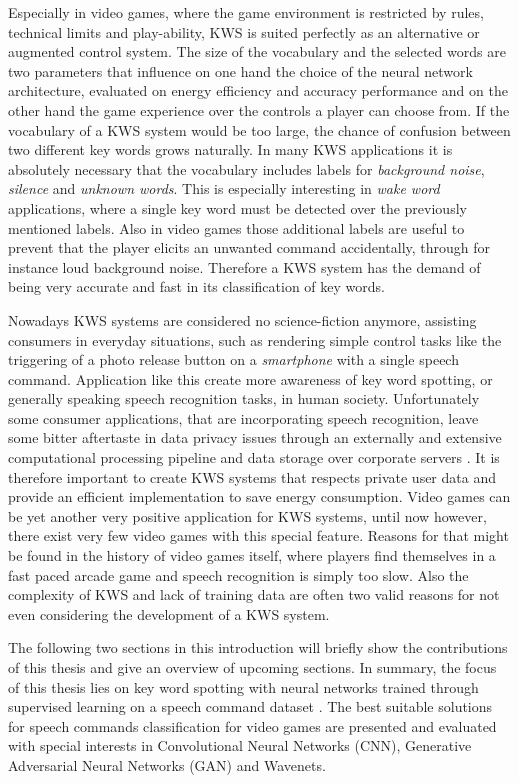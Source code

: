 Especially in video games, where the game environment is restricted by rules, technical limits and play-ability, KWS is suited perfectly as an alternative or augmented control system.
The size of the vocabulary and the selected words are two parameters that influence on one hand the choice of the neural network architecture, evaluated on energy efficiency and accuracy performance and on the other hand the game experience over the controls a player can choose from.
If the vocabulary of a KWS system would be too large, the chance of confusion between two different key words grows naturally.
In many KWS applications it is absolutely necessary that the vocabulary includes labels for \emph{background noise}, \emph{silence} and \emph{unknown words}. 
This is especially interesting in \emph{wake word} applications, where a single key word must be detected over the previously mentioned labels.
Also in video games those additional labels are useful to prevent that the player elicits an unwanted command accidentally, through for instance loud background noise.
Therefore a KWS system has the demand of being very accurate and fast in its classification of key words.

Nowadays KWS systems are considered no science-fiction anymore, assisting consumers in everyday situations, such as rendering simple control tasks like the triggering of a photo release button on a \emph{smartphone} with a single speech command.
Application like this create more awareness of key word spotting, or generally speaking speech recognition tasks, in human society.
Unfortunately some consumer applications, that are incorporating speech recognition, leave some bitter aftertaste in data privacy issues through an externally and extensive computational processing pipeline and data storage over corporate servers \cite{Tang2018}.
It is therefore important to create KWS systems that respects private user data and provide an efficient implementation to save energy consumption. 
Video games can be yet another very positive application for KWS systems, until now however, there exist very few video games with this special feature.
Reasons for that might be found in the history of video games itself, where players find themselves in a fast paced arcade game and speech recognition is simply too slow.
Also the complexity of KWS and lack of training data are often two valid reasons for not even considering the development of a KWS system.

The following two sections in this introduction will briefly show the contributions of this thesis and give an overview of upcoming sections.
In summary, the focus of this thesis lies on key word spotting with neural networks trained through supervised learning on a speech command dataset \cite{Warden2018}.
The best suitable solutions for speech commands classification for video games are presented and evaluated with special interests in Convolutional Neural Networks (CNN), Generative Adversarial Neural Networks (GAN) and Wavenets.

